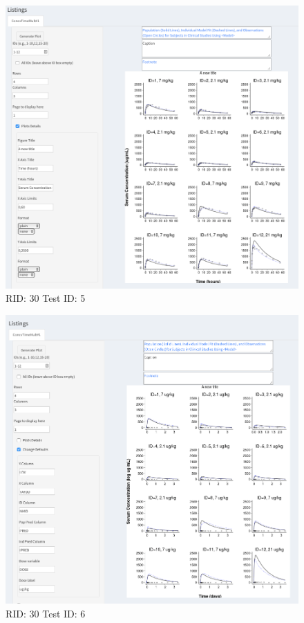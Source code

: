 \begin{figure}[H]
\includegraphics[width=.8\textwidth]{screencaps/30-5-1.png}
\caption{RID: 30 Test ID: 5}
\end{figure}
\begin{figure}[H]
\includegraphics[width=.8\textwidth]{screencaps/30-6-1.png}
\caption{RID: 30 Test ID: 6}
\end{figure}
